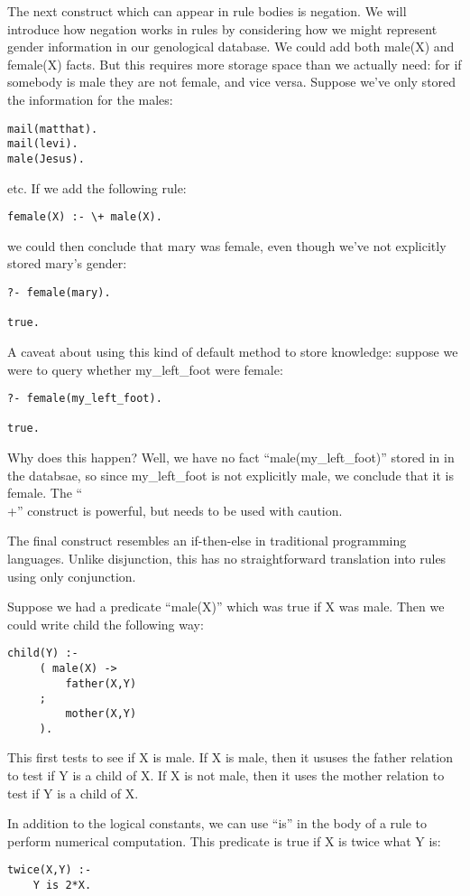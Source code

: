 \documentclass{book}[9pt]
\begin{document}
The next construct which can appear in rule bodies is negation.  We
will introduce how negation works in rules by considering how we might
represent gender information in our genological database.  We could 
add both male(X) and female(X) facts.  But this requires more storage space
than we actually need: for if somebody is male they are not female, and
vice versa.  Suppose we've only stored the information for the
males:
\begin{verbatim}
mail(matthat).
mail(levi).
male(Jesus).
\end{verbatim}
\noindent etc. If we add the following rule:
\begin{verbatim}
female(X) :- \+ male(X).
\end{verbatim}
\noindent we could then conclude that mary was female, even though
we've not explicitly stored mary's gender:
\begin{verbatim}
?- female(mary).

true.
\end{verbatim}

A caveat about using this kind of default method to store knowledge:
suppose we were to query whether my\_left\_foot were female:
\begin{verbatim}
?- female(my_left_foot).

true.
\end{verbatim}
\noindent Why does this happen? Well, we have no fact
``male(my\_left\_foot)'' stored in in the databsae, so since
my\_left\_foot is not explicitly male, we conclude that it is female.
The ``\\+'' construct is powerful, but needs to be used with caution.

The final construct resembles an if-then-else in traditional
programming languages.  Unlike disjunction, this has no
straightforward translation into rules using only conjunction.

Suppose we had a predicate ``male(X)'' which was true if X was male.
Then we could write child the following way:
\begin{verbatim}
child(Y) :-
     ( male(X) ->
         father(X,Y)
     ;
         mother(X,Y)
     ).
\end{verbatim}
\noindent This first tests to see if X is male. If X is male, then it
ususes the father relation to test if Y is a child of X.  If X is not 
male, then it uses the mother relation to test if Y is a child of X.

In addition to the logical constants, we can use ``is'' in the body
of a rule to perform numerical computation.  This predicate is true
if X is twice what Y is:
\begin{verbatim}
twice(X,Y) :-
    Y is 2*X.
\end{verbatim}
\end{document}
